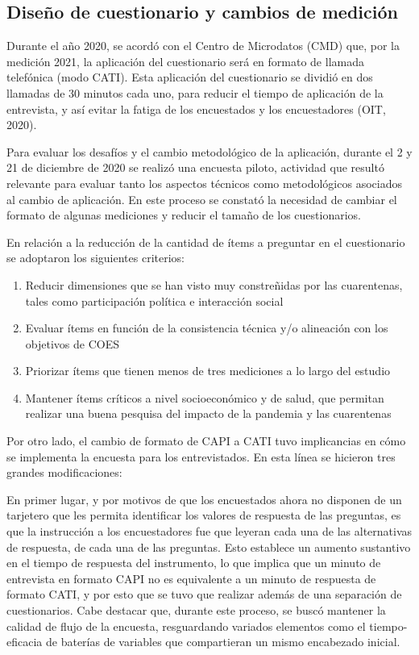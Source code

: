 \documentclass[
  12pt,
]{book}
\providecommand{\tightlist}{%
  \setlength{\itemsep}{0pt}\setlength{\parskip}{0pt}}
\begin{document}
\hypertarget{diseuxf1o-de-cuestionario-y-cambios-de-mediciuxf3n}{%
\subsection*{Diseño de cuestionario y cambios de medición}\label{diseuxf1o-de-cuestionario-y-cambios-de-mediciuxf3n}}

Durante el año 2020, se acordó con el Centro de Microdatos (CMD) que, por la medición 2021, la aplicación del cuestionario será en formato de llamada telefónica (modo CATI). Esta aplicación del cuestionario se dividió en dos llamadas de 30 minutos cada uno, para reducir el tiempo de aplicación de la entrevista, y así evitar la fatiga de los encuestados y los encuestadores (OIT, 2020).

Para evaluar los desafíos y el cambio metodológico de la aplicación, durante el 2 y 21 de diciembre de 2020 se realizó una encuesta piloto, actividad que resultó relevante para evaluar tanto los aspectos técnicos como metodológicos asociados al cambio de aplicación. En este proceso se constató la necesidad de cambiar el formato de algunas mediciones y reducir el tamaño de los cuestionarios.

En relación a la reducción de la cantidad de ítems a preguntar en el cuestionario se adoptaron los siguientes criterios:

\begin{enumerate}
\def\labelenumi{\arabic{enumi}.}
\tightlist
\item
  Reducir dimensiones que se han visto muy constreñidas por las cuarentenas, tales como participación política e interacción social
\item
  Evaluar ítems en función de la consistencia técnica y/o alineación con los objetivos de COES
\item
  Priorizar ítems que tienen menos de tres mediciones a lo largo del estudio
\item
  Mantener ítems críticos a nivel socioeconómico y de salud, que permitan realizar una buena pesquisa del impacto de la pandemia y las cuarentenas
\end{enumerate}

Por otro lado, el cambio de formato de CAPI a CATI tuvo implicancias en cómo se implementa la encuesta para los entrevistados. En esta línea se hicieron tres grandes modificaciones:

En primer lugar, y por motivos de que los encuestados ahora no disponen de un tarjetero que les permita identificar los valores de respuesta de las preguntas, es que la instrucción a los encuestadores fue que leyeran cada una de las alternativas de respuesta, de cada una de las preguntas. Esto establece un aumento sustantivo en el tiempo de respuesta del instrumento, lo que implica que un minuto de entrevista en formato CAPI no es equivalente a un minuto de respuesta de formato CATI, y por esto que se tuvo que realizar además de una separación de cuestionarios. Cabe destacar que, durante este proceso, se buscó mantener la calidad de flujo de la encuesta, resguardando variados elementos como el tiempo-eficacia de baterías de variables que compartieran un mismo encabezado inicial.
\end{document}
